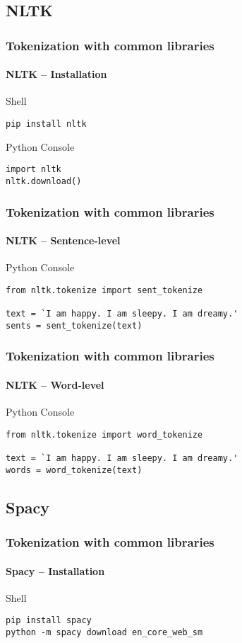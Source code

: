 \documentclass{beamer}
\begin{document}
\subsection{NLTK}
\begin{frame}[containsverbatim]
    \frametitle{Tokenization with common libraries}
    \framesubtitle{NLTK -- Installation}
    
    \begin{block}{Shell}
        \begin{lstlisting}
pip install nltk
        \end{lstlisting}
    \end{block}
    \begin{block}{Python Console}
        \begin{lstlisting}
import nltk
nltk.download()
        \end{lstlisting}
    \end{block}
    
\end{frame}

\begin{frame}[containsverbatim]
    \frametitle{Tokenization with common libraries}
    \framesubtitle{NLTK -- Sentence-level}
    \begin{block}{Python Console}
        \begin{lstlisting}
from nltk.tokenize import sent_tokenize

text = `I am happy. I am sleepy. I am dreamy.'
sents = sent_tokenize(text)
        \end{lstlisting}    
    \end{block}

\end{frame}

\begin{frame}[containsverbatim]
    \frametitle{Tokenization with common libraries}
    \framesubtitle{NLTK -- Word-level}
    \begin{block}{Python Console}
        \begin{lstlisting}
from nltk.tokenize import word_tokenize

text = `I am happy. I am sleepy. I am dreamy.' 
words = word_tokenize(text)
        \end{lstlisting}    
    \end{block}

\end{frame}

\subsection{Spacy}
\begin{frame}[containsverbatim]
    \frametitle{Tokenization with common libraries}
    \framesubtitle{Spacy -- Installation}
    \begin{block}{Shell}
        \begin{lstlisting}
pip install spacy
python -m spacy download en_core_web_sm
        \end{lstlisting}    
    \end{block}

\end{frame}
\end{document}
